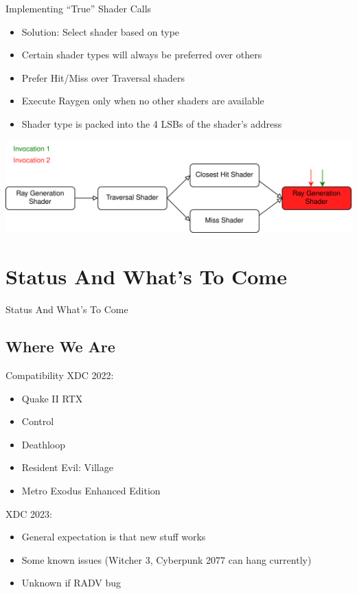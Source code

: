 \documentclass[aspectratio=169,t]{beamer}
\begin{document}
\begin{slide}{Implementing ``True'' Shader Calls}
 \begin{itemize}
  \item Solution: Select shader based on type
  \item Certain shader types will always be preferred over others
  \item Prefer Hit/Miss over Traversal shaders
  \item Execute Raygen only when no other shaders are available
  \item Shader type is packed into the 4 LSBs of the shader's address
 \end{itemize}
 \includegraphics[width=\textwidth]{graphics/RTStages2-8.png}
\end{slide}

\section{Status And What's To Come}

\chapterIntroConfig
\begin{slide}{Status And What's To Come}
\end{slide}

\subsection{Where We Are}
\begin{slide}{Compatibility}
 XDC 2022: \\
 \begin{itemize}
  \item Quake II RTX
  \item Control
  \item Deathloop
  \item Resident Evil: Village
  \item Metro Exodus Enhanced Edition
 \end{itemize}

 \pause

 \vspace{12pt}

 XDC 2023: \\
 \begin{itemize}
  \item General expectation is that new stuff works
  \item Some known issues (Witcher 3, Cyberpunk 2077 can hang currently)
  \item Unknown if RADV bug
 \end{itemize}
\end{slide}
\end{document}
